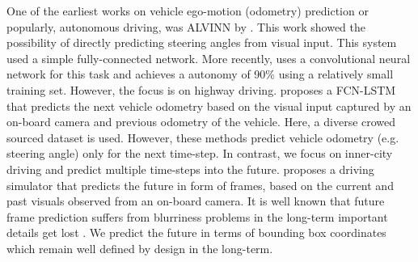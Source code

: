 One of the earliest works on vehicle ego-motion (odometry) prediction or popularly, autonomous driving, was ALVINN by \cite{pomerleau1989alvinn}. This work showed the possibility of directly predicting steering angles from visual input. This system used a simple fully-connected network. More recently, \cite{bojarski2016end} uses a convolutional neural network for this task and achieves a autonomy of 90\% using a relatively small training set. However, the focus is on highway driving. \cite{xu2016end} proposes a FCN-LSTM that predicts the next vehicle odometry based on the visual input captured by an on-board camera and previous odometry of the vehicle. Here, a diverse crowed sourced dataset is used. However, these methods predict vehicle odometry (e.g. steering angle) only for the next time-step. In contrast, we focus on inner-city driving and predict multiple time-steps into the future. \cite{santana2016learning} proposes a driving simulator that predicts the future in form of frames, based on the current and past visuals observed from an on-board camera. It is well known that future frame prediction suffers from blurriness problems in the long-term important details get lost \cite{mathieu2015deep}. We predict the future in terms of bounding box coordinates which remain well defined by design in the long-term.